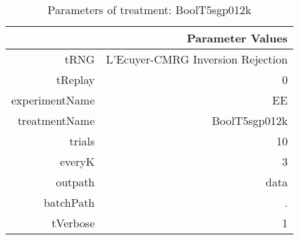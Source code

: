 \begin{table}[ht]
\centering
\begin{tabular}{rr}
  \hline
 & Parameter Values \\ 
  \hline
tRNG & L'Ecuyer-CMRG Inversion Rejection \\ 
  tReplay & 0 \\ 
  experimentName & EE \\ 
  treatmentName & BoolT5sgp012k \\ 
  trials & 10 \\ 
  everyK & 3 \\ 
  outpath & data \\ 
  batchPath & . \\ 
  tVerbose & 1 \\ 
   \hline
\end{tabular}
\caption{ Parameters of treatment: BoolT5sgp012k 
} 
\end{table}

